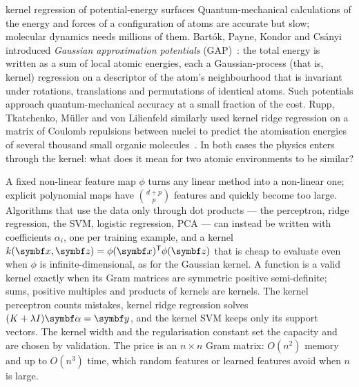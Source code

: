 \documentclass[11pt]{article}
\newcommand{\z}{\vect{z}}
\newcommand{\y}{\vect{y}}
\newcommand{\valpha}{\vect{\alpha}}
\begin{document}
\begin{physics}{kernel regression of potential-energy surfaces}
Quantum-mechanical calculations of the energy and forces of a configuration of atoms are accurate but slow; molecular
dynamics needs millions of them. Bart\'ok, Payne, Kondor and Cs\'anyi introduced \emph{Gaussian approximation potentials}
(GAP)~\cite{bartok2010}: the total energy is written as a sum of local atomic energies, each a Gaussian-process (that is,
kernel) regression on a descriptor of the atom's neighbourhood that is invariant under rotations, translations and
permutations of identical atoms. Such potentials approach quantum-mechanical accuracy at a small fraction of the
cost. Rupp, Tkatchenko, M\"uller and von Lilienfeld similarly used kernel
ridge regression on a matrix of Coulomb repulsions between nuclei to predict the atomisation energies of several thousand
small organic molecules~\cite{rupp2012}. In both cases the physics enters through the kernel: what does it mean for two
atomic environments to be similar?
\end{physics}

\begin{keyidea}[Summary]
A fixed non-linear feature map $\phi$ turns any linear method into a non-linear one; explicit polynomial maps have
$\binom{d+p}{p}$ features and quickly become too large. Algorithms that use the data only through dot products --- the
perceptron, ridge regression, the SVM, logistic regression, PCA --- can instead be written with coefficients
$\alpha_i$, one per training example, and a kernel $k(\x, \z) = \phi(\x)\T\phi(\z)$ that is cheap to evaluate even when
$\phi$ is infinite-dimensional, as for the Gaussian kernel. A function is a valid kernel exactly when its Gram matrices are
symmetric positive semi-definite; sums, positive multiples and products of kernels are kernels. The kernel perceptron
counts mistakes, kernel ridge regression solves $(K + \lambda I)\valpha = \y$, and the kernel SVM keeps only its support
vectors. The kernel width and the regularisation constant set the capacity and are chosen by validation. The price is an
$n \times n$ Gram matrix: $O(n^2)$ memory and up to $O(n^3)$ time, which random features or learned features avoid when
$n$ is large.
\end{keyidea}
\end{document}
